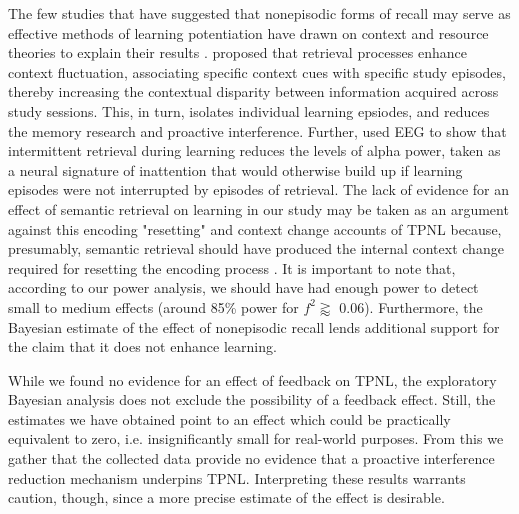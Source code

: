 \documentclass[../main.tex]{subfiles}
\begin{document}
The few studies that have suggested that nonepisodic forms of recall may serve 
as effective methods of learning potentiation have drawn on context and resource
theories to explain their results \citep{divisRetrievalSpeedsContext2014, 
pastotterRetrievalLearningFacilitates2011}. 
\cite{divisRetrievalSpeedsContext2014} proposed that retrieval processes 
enhance context fluctuation, associating specific context cues with specific 
study episodes, thereby increasing the contextual disparity between information 
acquired across study sessions. This, in turn, isolates individual learning 
epsiodes, and reduces the memory research and proactive interference. Further, 
\cite{pastotterRetrievalLearningFacilitates2011} used EEG to show that 
intermittent retrieval during learning reduces the levels of alpha power, taken 
as a neural signature of inattention \citep{palvaNewVistasAfrequency2007}
that would otherwise build up if learning episodes were not interrupted by 
episodes of retrieval. The lack of evidence for an effect of semantic retrieval 
on learning in our study may be taken as an argument against this encoding 
"resetting" and context change accounts of TPNL because, presumably, semantic 
retrieval should have produced the internal context change required for 
resetting the encoding process 
\cite{pastotterRetrievalLearningFacilitates2011}. It is important to note that, 
according to our power analysis, we should have had enough power to detect 
small to medium effects (around 85\% power for \(f^2 \gtrapprox\) 0.06). 
Furthermore, the Bayesian estimate of the effect of nonepisodic recall lends 
additional support for the claim that it does not enhance learning.

While we found no evidence for an effect of feedback on TPNL, the exploratory 
Bayesian analysis does not exclude the possibility of a feedback effect. Still, 
the estimates we have obtained point to an effect which could be practically 
equivalent to zero, i.e. insignificantly small for real-world purposes.
From this we gather that the collected data provide no evidence that a 
proactive interference reduction mechanism underpins TPNL. Interpreting these 
results warrants caution, though, since a more precise estimate of the effect 
is desirable.
\end{document}
